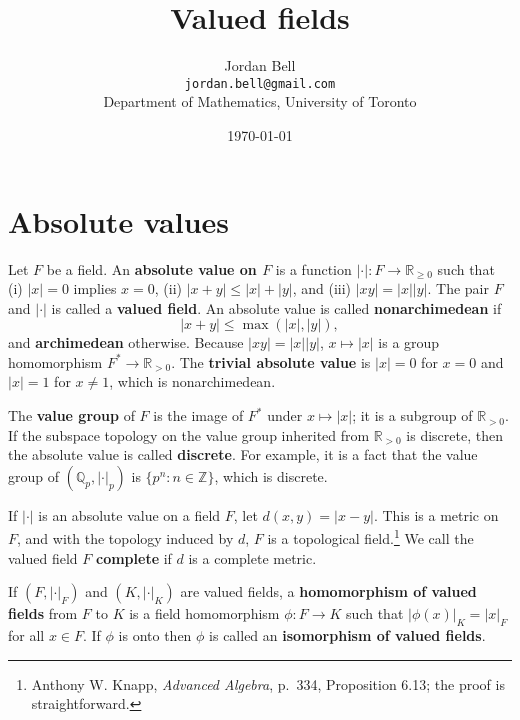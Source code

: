 \documentclass{article}
\theoremstyle{definition}
\begin{document}
\title{Valued fields}
\author{Jordan Bell\\ \texttt{jordan.bell@gmail.com}\\Department of Mathematics, University of Toronto}
\date{\today}

\maketitle

\section{Absolute values}
Let $F$ be a field. An \textbf{absolute value on $F$} is a function $|\cdot|:F \to \mathbb{R}_{\geq 0}$ 
such that (i) $|x|=0$ implies $x=0$, (ii) $|x+y| \leq |x|+|y|$, and (iii) $|xy|=|x||y|$.
The pair $F$ and $|\cdot|$ is called a \textbf{valued field}.
An absolute value is
called \textbf{nonarchimedean} if
\[
|x+y| \leq \max(|x|,|y|),
\]
and \textbf{archimedean} otherwise. 
Because $|xy|=|x||y|$, 
$x \mapsto |x|$ is a group homomorphism $F^* \to \mathbb{R}_{>0}$. 
The \textbf{trivial absolute value} is $|x|=0$ for $x=0$ and $|x|=1$ for $x \neq 1$, which is nonarchimedean.

The \textbf{value group} of $F$ is the image of $F^*$ under $x \mapsto |x|$; it is a subgroup of $\mathbb{R}_{>0}$. 
If the subspace topology on the value group inherited from $\mathbb{R}_{> 0}$ is discrete, then the absolute value is called
\textbf{discrete}. For example, it is a fact that the value group of $(\mathbb{Q}_p,|\cdot|_p)$ is $\{p^{n}: n \in \mathbb{Z}\}$, which is discrete. 

If $|\cdot|$ is an absolute value on a field $F$, let $d(x,y) = |x-y|$. This is a metric on $F$, and with the topology induced
by $d$, $F$ is a topological field.\footnote{Anthony W. Knapp,
{\em Advanced Algebra}, p.~334, Proposition 6.13; the proof is straightforward.}
We call the valued field $F$ \textbf{complete} if $d$ is a complete metric.

If $(F,|\cdot|_F)$ and $(K,|\cdot|_K)$ are valued fields, a \textbf{homomorphism of valued fields} from $F$ to $K$ 
is a field homomorphism $\phi:F \to K$ such that
$|\phi(x)|_K = |x|_F$ for all $x \in F$. If $\phi$ is onto then $\phi$ is called an \textbf{isomorphism of valued fields}.
\end{document}
